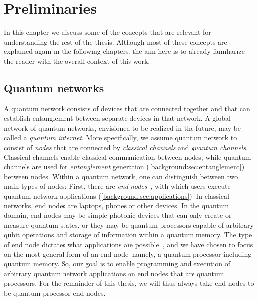 \chapter
 [Preliminaries]
 {Preliminaries}
\label{chp:background}


In this chapter we discuss some of the concepts that are relevant for understanding the rest of the thesis.
Although most of these concepts are explained again in the following chapters, the aim here is to already familiarize the reader with the overall context of this work.

\section{Quantum networks}

A quantum network consists of devices that are connected together and that can establish entanglement between separate devices in that network.
A global network of quantum networks, envisioned to be realized in the future, may be called a \emph{quantum internet}.
More specifically, we assume quantum network to consist of \textit{nodes} that are connected by \textit{classical channels} and \textit{quantum channels}.
Classical channels enable classical communication between nodes, while quantum channels are used for \textit{entanglement} generation (\cref{background:sec:entanglement}) between nodes.
Within a quantum network, one can distinguish between two main types of nodes: First, there are \emph{end nodes}~\cite{wehner_2018_stages}, with which users execute quantum network applications (\cref{background:sec:applications}).
In classical networks, end nodes are laptops, phones or other devices.
In the quantum domain, end nodes may be simple photonic devices that can only create or measure quantum states, or they may be quantum processors capable of arbitrary qubit operations and storage of information within a quantum memory.
The type of end node dictates what applications are possible~\cite{wehner_2018_stages}, and we have chosen to focus on the most general form of an end node, namely, a quantum processor including quantum memory.
So, our goal is to enable programming and execution of arbitrary quantum network applications on end nodes that are quantum processors.
For the remainder of this thesis, we will thus always take end nodes to be quantum-processor end nodes.


